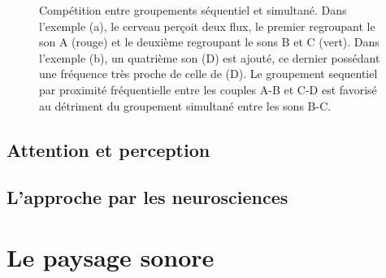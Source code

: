 \begin{figure}[bth]
        \myfloatalign
        \caption[Compétition entre groupements séquentiel et simultané]{Compétition entre groupements séquentiel et simultané. Dans l'exemple (a), le cerveau perçoit deux flux, le premier regroupant le son A (rouge) et le deuxième regroupant le sons B et C (vert). Dans l'exemple (b), un quatrième son (D) est ajouté, ce dernier possédant une fréquence très proche de celle de (D). Le groupement sequentiel par proximité fréquentielle entre les couples A-B et C-D est favorisé au détriment du groupement simultané entre les sons B-C.}\label{fig:simvsseq}
\end{figure}

\subsection{Attention et perception}

\subsection{L'approche par les neurosciences}

\section{Le paysage sonore}
\label{sec:paysageSonore}

